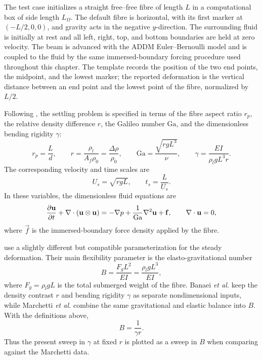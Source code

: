 The test case initializes a straight free--free fibre of length \(L\) in a
computational box of side length \(L_\Omega\). The default fibre is horizontal,
with its first marker at \((-L/2,0,0)\), and gravity acts in the negative
\(y\)-direction. The surrounding fluid is initially at rest and all left,
right, top, and bottom boundaries are held at zero velocity. The beam is
advanced with the ADDM Euler--Bernoulli model and is coupled to the fluid by
the same immersed-boundary forcing procedure used throughout this chapter. The
template records the position of the two end points, the midpoint, and the
lowest marker; the reported deformation is the vertical distance between an end
point and the lowest point of the fibre, normalized by \(L/2\).

Following \textcite{banaei_inertial_2020}, the settling problem is specified in
terms of the fibre aspect ratio \(r_p\), the relative density difference \(r\),
the Galileo number \(\mathrm{Ga}\), and the dimensionless bending rigidity
\(\gamma\):
\begin{equation}
    r_p = \frac{L}{d},
    \qquad
    r = \frac{\rho_l}{A_f\rho_0}
    = \frac{\Delta\rho}{\rho_0},
    \qquad
    \mathrm{Ga} =
    \frac{\sqrt{r g L^3}}{\nu},
    \qquad
    \gamma =
    \frac{EI}{\rho_l g L^3 r}.
    \label{eq:banaei-settling-groups}
\end{equation}
The corresponding velocity and time scales are
\begin{equation}
    U_s = \sqrt{r g L},
    \qquad
    t_s = \frac{L}{U_s}.
\end{equation}
In these variables, the dimensionless fluid equations are
\begin{equation}
    \pdv{\mathbf{u}}{t}
    + \nabla\cdot(\mathbf{u}\otimes\mathbf{u})
    =
    -\nabla p
    + \frac{1}{\mathrm{Ga}}\nabla^2\mathbf{u}
    + \mathbf{f},
    \qquad
    \nabla\cdot\mathbf{u} = 0,
\end{equation}
where \(\vec f\) is the immersed-boundary force density applied by the fibre.

\textcite{marchetti_deformation_2018} use a slightly different but compatible
parameterization for the steady deformation. Their main flexibility parameter
is the elasto-gravitational number
\begin{equation}
    B = \frac{F_g L^2}{EI}
    = \frac{\rho_l g L^3}{EI},
\end{equation}
where \(F_g=\rho_l g L\) is the total submerged weight of the fibre. Banaei
\emph{et al.} keep the density contrast \(r\) and bending rigidity \(\gamma\)
as separate nondimensional inputs, while Marchetti \emph{et al.} combine the
same gravitational and elastic balance into \(B\). With the definitions above,
\begin{equation}
    B = \frac{1}{\gamma r}.
\end{equation}
Thus the present sweep in \(\gamma\) at fixed \(r\) is plotted as a sweep in
\(B\) when comparing against the Marchetti data.

